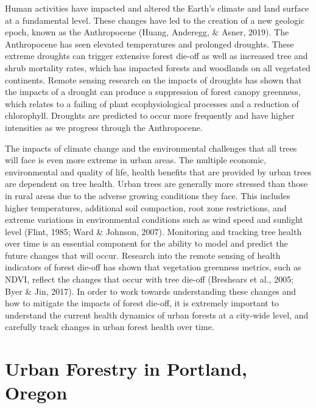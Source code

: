 \documentclass[12pt,twoside]{reedthesis}
\begin{document}
Human activities have impacted and altered the Earth's climate and land surface at a fundamental level. These changes have led to the creation of a new geologic epoch, known as the Anthropocene (Huang, Anderegg, \& Asner, 2019). The Anthropocene has seen elevated temperatures and prolonged droughts. These extreme droughts can trigger extensive forest die-off as well as increased tree and shrub mortality rates, which has impacted forests and woodlands on all vegetated continents. Remote sensing research on the impacts of droughts has shown that the impacts of a drought can produce a suppression of forest canopy greenness, which relates to a failing of plant ecophysiological processes and a reduction of chlorophyll. Droughts are predicted to occur more frequently and have higher intensities as we progress through the Anthropocene.

The impacts of climate change and the environmental challenges that all trees will face is even more extreme in urban areas. The multiple economic, environmental and quality of life, health benefits that are provided by urban trees are dependent on tree health. Urban trees are generally more stressed than those in rural areas due to the adverse growing conditions they face. This includes higher temperatures, additional soil compaction, root zone restrictions, and extreme variations in environmental conditions such as wind speed and sunlight level (Flint, 1985; Ward \& Johnson, 2007). Monitoring and tracking tree health over time is an essential component for the ability to model and predict the future changes that will occur. Research into the remote sensing of health indicators of forest die-off has shown that vegetation greenness metrics, such as NDVI, reflect the changes that occur with tree die-off (Breshears et al., 2005; Byer \& Jin, 2017). In order to work towards understanding these changes and how to mitigate the impacts of forest die-off, it is extremely important to understand the current health dynamics of urban forests at a city-wide level, and carefully track changes in urban forest health over time.

\hypertarget{urban-forestry-in-portland-oregon}{%
\section{Urban Forestry in Portland, Oregon}\label{urban-forestry-in-portland-oregon}}
\end{document}

